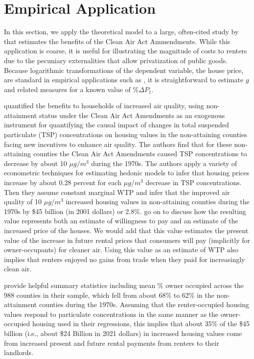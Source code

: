 \documentclass[ecta,nameyear,draft]{econsocart}
\theoremstyle{plain}
\theoremstyle{remark}
\begin{document}
 
\section{Empirical Application}
In this section, we apply the theoretical model to a large, often-cited study by \cite{chaygreenstone05} that estimates the benefits of the Clean Air Act Ammendments. While this application is coarse, it is useful for illustrating the magnitude of costs to renters due to the pecuniary externalities that allow privatization of public goods.  Because logarithmic transformations of the dependent variable, the house price, are standard in empirical applications such as \cite{chaygreenstone05}, it is straightforward to estimate $g$ and related measures for a known value of $\%\Delta P_1 $. 

\cite{chaygreenstone05} quantified the benefits to households of increased air quality, using non-attainment status under the Clean Air Act Amendments as an exogenous instrument for quantifying the causal impact of changes in total suspended particulate (TSP) concentrations on housing values in the non-attaining counties facing new incentives to enhance air quality. The authors find that for these non-attaining counties the Clean Air Act Amendments caused TSP concentrations to decrease by about 10 $\mu g/m^3$ during the 1970s. The authors apply a variety of econometric techniques for estimating hedonic models to infer that housing prices increase by about 0.28 percent for each $\mu g/m^3$ decrease in TSP concentrations. Then they assume constant marginal WTP and infer that the improved air quality of 10 $\mu g/m^3$ increased housing values in non-attaining counties during the 1970s by \$45 billion (in 2001 dollars) or 2.8\%. \cite{chaygreenstone05} go on to discuss how the resulting value represents both an estimate of willingness to pay and an estimate of the increased price of the houses. We would add that this value estimates the present value of the increase in future rental prices that consumers will pay (implicitly for owner-occupants) for cleaner air. Using this value as an estimate of WTP also implies that renters enjoyed no gains from trade when they paid for increasingly clean air.

\cite{chaygreenstone05} provide helpful summary statistics including mean \% owner occupied across the 988 counties in their sample, which fell from about 68\% to 62\% in the non-attainment counties during the 1970s. Assuming that the renter-occupied housing values respond to particulate concentrations in the same manner as the owner-occupied housing used in their regressions, this implies that about 35\% of the \$45 billion (i.e., about \$24 Billion in 2021 dollars) in increased housing values come from increased present and future rental payments from renters to their landlords. 
\end{document}
